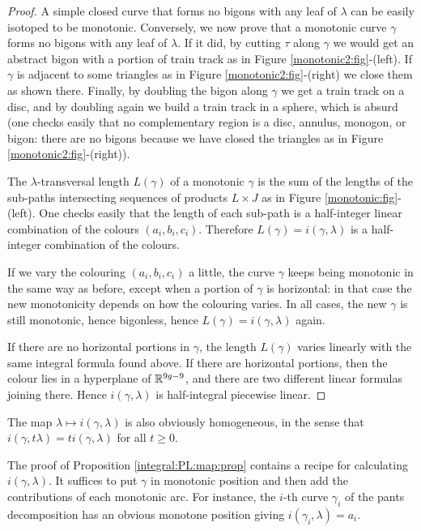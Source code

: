 \begin{proof}
A simple closed curve that forms no bigons with any leaf of $\lambda$ can be easily isotoped to be monotonic. Conversely, we now prove that a monotonic curve $\gamma$ forms no bigons with any leaf of $\lambda$. If it did, by cutting $\tau$ along $\gamma$ we would get an abstract bigon with a portion of train track as in Figure \ref{monotonic2:fig}-(left). If $\gamma$ is adjacent to some triangles as in Figure \ref{monotonic2:fig}-(right) we close them as shown there. Finally, by doubling the bigon along $\gamma$ we get a train track on a disc, and by doubling again we build a train track in a sphere, which is absurd (one checks easily that no complementary region is a disc, annulus, monogon, or bigon: there are no bigons because we have closed the triangles as in Figure \ref{monotonic2:fig}-(right)).

The $\lambda$-transversal length $L(\gamma)$ of a monotonic $\gamma$ is the sum of the lengths of the sub-paths intersecting sequences of products $L\times J$ as in Figure \ref{monotonic:fig}-(left). One checks easily that the length of each sub-path is a half-integer linear combination of the colours $(a_i,b_i,c_i)$. Therefore $L(\gamma) = i(\gamma,\lambda)$ is a half-integer combination of the colours.

If we vary the colouring $(a_i,b_i,c_i)$ a little, the curve $\gamma$ keeps being monotonic in the same way as before, except when a portion of $\gamma$ is horizontal: in that case the new monotonicity depends on how the colouring varies. In all cases, the new $\gamma$ is still monotonic, hence bigonless, hence $L(\gamma)=i(\gamma, \lambda)$ again. 

If there are no horizontal portions in $\gamma$, the length $L(\gamma)$ varies linearly with the same integral formula found above. If there are horizontal portions, then the colour lies in a hyperplane of $\mathbb{R}^{9g-9}$, and there are two different linear formulas joining there. Hence $i(\gamma,\lambda)$ is half-integral piecewise linear.
\end{proof}

The map $\lambda \mapsto i(\gamma, \lambda)$ is also obviously homogeneous, in the sense that $i(\gamma, t\lambda) = ti(\gamma, \lambda)$ for all $t\geqslant 0$. 

The proof of Proposition \ref{integral:PL:map:prop} contains a recipe for calculating $i(\gamma, \lambda)$. It suffices to put $\gamma$ in monotonic position and then add the contributions of each monotonic arc. For instance, the $i$-th curve $\gamma_i$ of the pants decomposition has an obvious monotone position giving $i(\gamma_i,\lambda) = a_i$.

